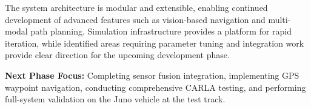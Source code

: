The system architecture is modular and extensible, enabling continued development of advanced features such as vision-based navigation and multi-modal path planning. Simulation infrastructure provides a platform for rapid iteration, while identified areas requiring parameter tuning and integration work provide clear direction for the upcoming development phase.

\textbf{Next Phase Focus:} Completing sensor fusion integration, implementing GPS waypoint navigation, conducting comprehensive CARLA testing, and performing full-system validation on the Juno vehicle at the test track.
